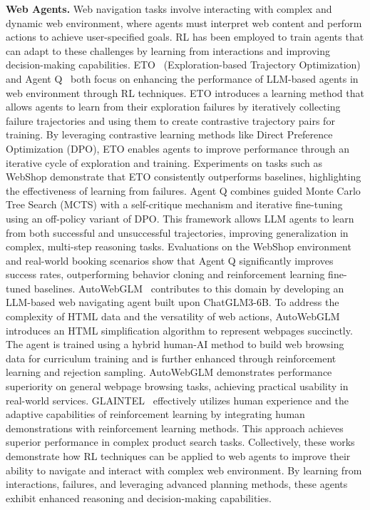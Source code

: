 \noindent\textbf{Web Agents.}
Web navigation tasks involve interacting with complex and dynamic web environment, where agents must interpret web content and perform actions to achieve user-specified goals. RL has been employed to train agents that can adapt to these challenges by learning from interactions and improving decision-making capabilities.
ETO~\cite{song2024trial} (Exploration-based Trajectory Optimization) and Agent Q~\cite{putta2024agentq} both focus on enhancing the performance of LLM-based agents in web environment through RL techniques. ETO introduces a learning method that allows agents to learn from their exploration failures by iteratively collecting failure trajectories and using them to create contrastive trajectory pairs for training. By leveraging contrastive learning methods like Direct Preference Optimization (DPO), ETO enables agents to improve performance through an iterative cycle of exploration and training. Experiments on tasks such as WebShop demonstrate that ETO consistently outperforms baselines, highlighting the effectiveness of learning from failures.
Agent Q combines guided Monte Carlo Tree Search (MCTS) with a self-critique mechanism and iterative fine-tuning using an off-policy variant of DPO. This framework allows LLM agents to learn from both successful and unsuccessful trajectories, improving generalization in complex, multi-step reasoning tasks. Evaluations on the WebShop environment and real-world booking scenarios show that Agent Q significantly improves success rates, outperforming behavior cloning and reinforcement learning fine-tuned baselines.
AutoWebGLM~\cite{lai2024autowebglm} contributes to this domain by developing an LLM-based web navigating agent built upon ChatGLM3-6B. To address the complexity of HTML data and the versatility of web actions, AutoWebGLM introduces an HTML simplification algorithm to represent webpages succinctly. The agent is trained using a hybrid human-AI method to build web browsing data for curriculum training and is further enhanced through reinforcement learning and rejection sampling. AutoWebGLM demonstrates performance superiority on general webpage browsing tasks, achieving practical usability in real-world services.
GLAINTEL~\cite{Fereidouni_2024} effectively utilizes human experience and the adaptive capabilities of reinforcement learning by integrating human demonstrations with reinforcement learning methods. This approach achieves superior performance in complex product search tasks.
Collectively, these works demonstrate how RL techniques can be applied to web agents to improve their ability to navigate and interact with complex web environment. By learning from interactions, failures, and leveraging advanced planning methods, these agents exhibit enhanced reasoning and decision-making capabilities.


